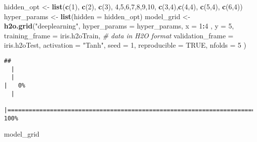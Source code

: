 \documentclass[
]{book}
\newenvironment{Shaded}{\begin{snugshade}}{\end{snugshade}}
\newcommand{\CommentTok}[1]{\textcolor[rgb]{0.56,0.35,0.01}{\textit{#1}}}
\newcommand{\DataTypeTok}[1]{\textcolor[rgb]{0.13,0.29,0.53}{#1}}
\newcommand{\DecValTok}[1]{\textcolor[rgb]{0.00,0.00,0.81}{#1}}
\newcommand{\KeywordTok}[1]{\textcolor[rgb]{0.13,0.29,0.53}{\textbf{#1}}}
\newcommand{\NormalTok}[1]{#1}
\newcommand{\OperatorTok}[1]{\textcolor[rgb]{0.81,0.36,0.00}{\textbf{#1}}}
\newcommand{\OtherTok}[1]{\textcolor[rgb]{0.56,0.35,0.01}{#1}}
\newcommand{\StringTok}[1]{\textcolor[rgb]{0.31,0.60,0.02}{#1}}
\begin{document}
\begin{Shaded}
\begin{Highlighting}[]
\NormalTok{hidden_opt <-}\StringTok{ }\KeywordTok{list}\NormalTok{(}\KeywordTok{c}\NormalTok{(}\DecValTok{1}\NormalTok{), }\KeywordTok{c}\NormalTok{(}\DecValTok{2}\NormalTok{), }\KeywordTok{c}\NormalTok{(}\DecValTok{3}\NormalTok{), }\DecValTok{4}\NormalTok{,}\DecValTok{5}\NormalTok{,}\DecValTok{6}\NormalTok{,}\DecValTok{7}\NormalTok{,}\DecValTok{8}\NormalTok{,}\DecValTok{9}\NormalTok{,}\DecValTok{10}\NormalTok{, }\KeywordTok{c}\NormalTok{(}\DecValTok{3}\NormalTok{,}\DecValTok{4}\NormalTok{),}\KeywordTok{c}\NormalTok{(}\DecValTok{4}\NormalTok{,}\DecValTok{4}\NormalTok{), }\KeywordTok{c}\NormalTok{(}\DecValTok{5}\NormalTok{,}\DecValTok{4}\NormalTok{), }\KeywordTok{c}\NormalTok{(}\DecValTok{6}\NormalTok{,}\DecValTok{4}\NormalTok{))}
\NormalTok{hyper_params <-}\StringTok{ }\KeywordTok{list}\NormalTok{(}\DataTypeTok{hidden =}\NormalTok{ hidden_opt)}
\NormalTok{model_grid <-}\StringTok{ }\KeywordTok{h2o.grid}\NormalTok{(}\StringTok{"deeplearning"}\NormalTok{,}
  \DataTypeTok{hyper_params =}\NormalTok{ hyper_params,}
  \DataTypeTok{x =} \DecValTok{1}\OperatorTok{:}\DecValTok{4}\NormalTok{ ,}
  \DataTypeTok{y =} \DecValTok{5}\NormalTok{, }
  \DataTypeTok{training_frame =}\NormalTok{ iris.h2oTrain, }\CommentTok{# data in H2O format}
  \DataTypeTok{validation_frame =}\NormalTok{ iris.h2oTest,}
  \DataTypeTok{activation =} \StringTok{"Tanh"}\NormalTok{,}
  \DataTypeTok{seed =} \DecValTok{1}\NormalTok{, }\DataTypeTok{reproducible =} \OtherTok{TRUE}\NormalTok{, }\DataTypeTok{nfolds =} \DecValTok{5}
\NormalTok{  )}
\end{Highlighting}
\end{Shaded}

\begin{verbatim}
## 
  |                                                                            
  |                                                                      |   0%
  |                                                                            
  |======================================================================| 100%
\end{verbatim}

\begin{Shaded}
\begin{Highlighting}[]
\NormalTok{model_grid}
\end{Highlighting}
\end{Shaded}
\end{document}
